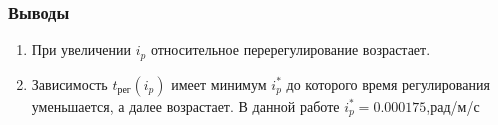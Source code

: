 \documentclass[a4paper,12pt]{article}
\begin{document}
\begin{enumerate}
                            
                \end{enumerate}
                \subsubsection{Выводы}
                \begin{enumerate}
                    \item При увеличении $i_p$ относительное перерегулирование  возрастает.
                    \item Зависимость $t_{\text{рег}}(i_p)$ имеет минимум $i^*_p$  до которого время регулирования уменьшается, а далее возрастает. В данной работе $i^*_p=0.000175$,рад/м/с 
                \end{enumerate}
\end{document}
